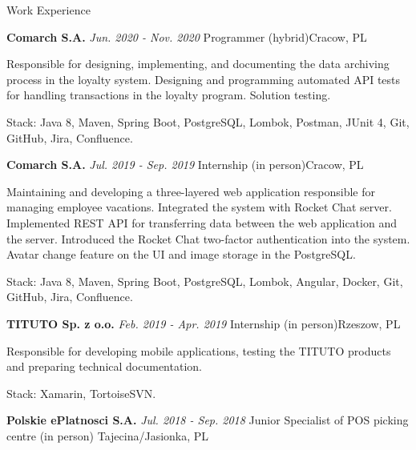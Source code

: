 \documentclass{resume}
\begin{document}
\begin{rSection}{Work Experience}
\begin{rSubsection}
    \end{rSubsection}

    \begin{rSubsection}
        {\bf Comarch S.A.}
        {\em Jun. 2020 - Nov. 2020}
        {\normalfont Programmer (hybrid)}{Cracow, PL}

        \item[] {Responsible for designing, implementing, and documenting the data archiving process in the loyalty system. Designing and programming
                    automated API tests for handling transactions in the loyalty program. Solution testing.}
        \item[] {Stack: Java 8, Maven, Spring Boot, PostgreSQL, Lombok, Postman, JUnit 4, Git, GitHub, Jira, Confluence.}

    \end{rSubsection}

    \begin{rSubsection}
        {\bf Comarch S.A.}
        {\em Jul. 2019 - Sep. 2019}
        {\normalfont Internship (in person)}{Cracow, PL}

        \item[] {Maintaining and developing a three-layered web application responsible for managing employee vacations.
                    Integrated the system with Rocket Chat server. Implemented REST API for transferring data between the web
                    application and the server. Introduced the Rocket Chat two-factor authentication into the system.
                    Avatar change feature on the UI and image storage in the PostgreSQL.}
        \item[] {Stack: Java 8, Maven, Spring Boot, PostgreSQL, Lombok, Angular, Docker, Git, GitHub, Jira, Confluence.}

    \end{rSubsection}

    \begin{rSubsection}
        {\bf TITUTO Sp. z o.o.}
        {\em Feb. 2019 - Apr. 2019}
        {\normalfont Internship (in person)}{Rzeszow, PL}

        \item[] {Responsible for developing mobile applications, testing the TITUTO products and preparing technical documentation.}
        \item[] {Stack: Xamarin, TortoiseSVN.}

    \end{rSubsection}

    \begin{rSubsection}
        {\bf Polskie ePlatnosci S.A.}
        {\em Jul. 2018 - Sep. 2018}
        {\normalfont Junior Specialist of POS picking centre (in person)}
        {Tajecina/Jasionka, PL}


\end{rSubsection}
\end{rSection}
\end{document}
